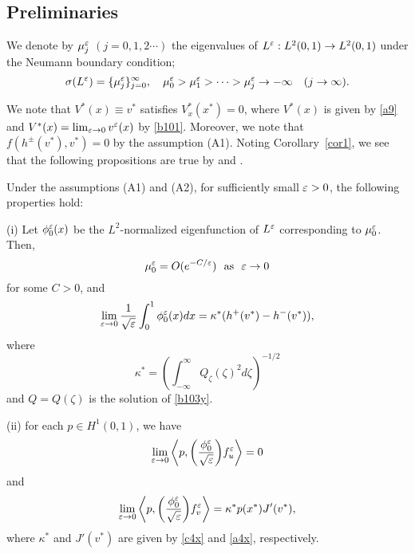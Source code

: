 \documentclass[a4,10pt]{article}
\begin{document}
\subsection{Preliminaries}   %

We denote by $\mu_j^\varepsilon$ $(j =0,1,2 \cdots )$ the eigenvalues of 
$L^\varepsilon : L^2(0, 1) \to L^2(0, 1)$ under the Neumann boundary condition;
%
\[
\sigma(L^\ep) = \{ \mu_j^\ep \}_{j=0}^\infty,  \ \ \ 
\mu_0^\ep > \mu_1^\ep > \cdots > \mu_j^\ep \to - \infty \quad (j \to \infty).
\]

We note that 
$V^*(x) \equiv v^*$ satisfies $V^*_x(x^*) = 0$,
where $V^*(x)$ is given by \eqref{a9} and $V^*(x) = \lim_{\varepsilon \to 0} v^\varepsilon(x) $
by \eqref{b101}. 
Moreover, we note that $f(h^\pm(v^*), v^*) = 0$ by the assumption (A1).
Noting Corollary~\ref{cor1}, 
we see that the following propositions are true by
\cite[Proposition 5.1]{HS} and
\cite[Corollary 1.3, Lemma 1.4 and Lemma 2.3]{NF}. 

\begin{prop}\label{prop1c}
Under the assumptions (A1) and (A2), for sufficiently small $\varepsilon > 0$, the following properties hold:

\no
{\rm (i)}  Let $\phi_0^\varepsilon(x)$ be the $L^2$-normalized eigenfunction of $L^\varepsilon$
corresponding to $\mu_0^\varepsilon$. Then, 
%
\begin{equation}\label{c3}
\mu_0^\varepsilon = O(e^{-C/\varepsilon}) \ \  \text{as} \ \ \varepsilon \to 0
\end{equation}
%
for some $C>0$, and
%
\begin{equation}\label{c4}
\lim_{\varepsilon \to 0} \frac{1}{\sqrt{\varepsilon}} \int_0^1 \phi_0^\varepsilon(x) dx 
= \kappa^*(h^+(v^*) - h^-(v^*)),
\end{equation}
%
where 
%
\begin{equation}\label{c4x}
\kappa^* = \left( \int_{-\infty}^\infty Q_\zeta(\zeta)^2 d\zeta  \right)^{-1/2}
\end{equation}
%
and $Q=Q(\zeta)$ is the solution of \eqref{b103y}. 

%
\no
{\rm (ii)} 
for each $p \in H^1(0, 1)$, we have
%
\begin{equation}\label{c6}
\displaystyle\lim_{\varepsilon \to 0} \left\langle p, \left(\frac{\phi_0^\varepsilon}{\sqrt{\varepsilon}} \right) \! f_u^\varepsilon \right\rangle = 0
\end{equation}
%
and
%
\begin{equation}\label{c7}
\displaystyle\lim_{\varepsilon \to 0} \left\langle p, \left(\frac{\phi_0^\varepsilon}{\sqrt{\varepsilon}} \right) \! f_v^\varepsilon \right\rangle = 
 \kappa^* p(x^*)J'(v^*),
\end{equation}
%
where $\kappa^*$ and $J'(v^*)$ are given by \eqref{c4x}
and \eqref{a4x}, respectively.
\end{prop}
\end{document}
